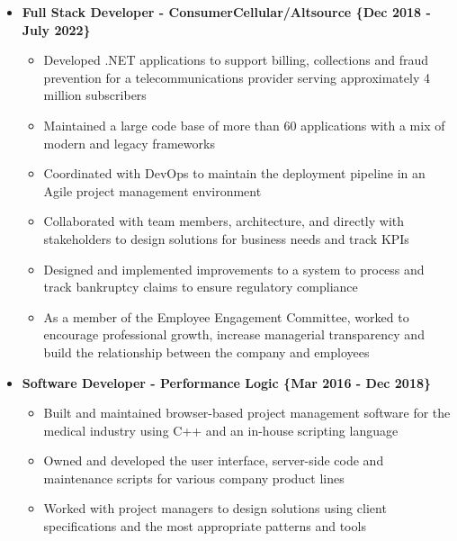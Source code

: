 
\begin{itemize}

\item \textbf{Full Stack Developer - ConsumerCellular/Altsource \{Dec 2018 - July 2022\}}
\begin{itemize}
\item Developed .NET applications to support billing, collections and fraud prevention for a telecommunications provider serving approximately 4 million subscribers
\item Maintained a large code base of more than 60 applications with a mix of modern and legacy frameworks
\item Coordinated with DevOps to maintain the deployment pipeline in an Agile project management environment
\item Collaborated with team members, architecture, and directly with stakeholders to design solutions for business needs and track KPIs
\item Designed and implemented improvements to a system to process and track bankruptcy claims to ensure regulatory compliance
\item As a member of the Employee Engagement Committee, worked to encourage professional growth, increase managerial transparency and build the relationship between the company and employees
\end{itemize}


\item \textbf{Software Developer - Performance Logic  \{Mar 2016 - Dec 2018\}}
\begin{itemize}
\item Built and maintained browser-based project management software for the medical industry using C++ and an in-house scripting language
\item Owned and developed the user interface, server-side code and maintenance scripts for various company product lines
\item Worked with project managers to design solutions using client specifications and the most appropriate patterns and tools
\end{itemize}



\end{itemize}
